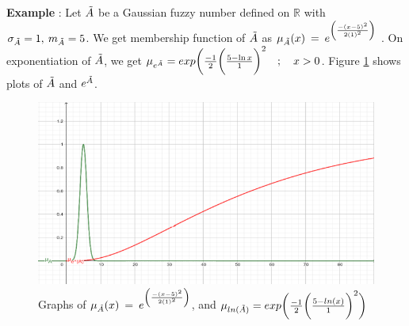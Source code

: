 \documentclass{article}
\begin{document}
\textbf{Example} : Let $\Tilde{A}$ be a Gaussian fuzzy number defined on $\mathbb{R}$ with $\sigma_{\Tilde{A}} = 1, \:m_{\Tilde{A}} = 5$. We get membership function of $\Tilde{A}$  as $\mu_{\Tilde{A}}(x) \:=\:e^{\left( \frac{-(x-5)^2}{2(1)^{2}} \right)}$ . On exponentiation of $\Tilde{A}$, we get $\mu_{e^{\Tilde{A}}}=exp\biggl(\frac{-1}{2}\biggl({\frac{5-\ln{x}}{1}}\biggr)^2\quad ;\quad x > 0 $. Figure \ref{fig:e_img} shows  plots of $\Tilde{A}$ and $e^{\Tilde{A}}$.


\begin{figure}[h!]
    \centering
    \includegraphics[scale=0.7]{gaussian_e.png}
    \caption{\label{fig:e_img} Graphs of $\mu_{\Tilde{A}}(x) \:=\:e^{\left( \frac{-(x-5)^2}{2(1)^{2}} \right)}$, and $\mu_{ln({\Tilde{A}})}=exp\biggl(\frac{-1}{2}\biggl({\frac{5-ln({x})}{1}}\biggr)^2\biggr)$}
    
    \label{fig:e_img}
\end{figure}
\end{document}
